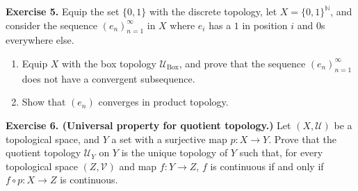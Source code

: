 \documentclass[12pt]{article}
\begin{document}
\clearpage

\noindent\textbf{Exercise 5.}
Equip the set $\{0,1\}$ with the discrete topology, let $X = \{0,1\}^{\mathbb{N}}$, and consider the sequence $(e_n)_{n=1}^{\infty}$ in $X$ where $e_i$ has a $1$ in position $i$ and $0$s everywhere else.
\begin{enumerate}
\item[(i)] Equip $X$ with the box topology $\mathcal{U}_{\mathrm{Box}}$, and prove that the sequence $(e_n)_{n=1}^{\infty}$ does not have a convergent subsequence.
\item[(ii)] Show that $(e_n)$ converges in product topology.
\end{enumerate}

\clearpage

\noindent\textbf{Exercise 6. (Universal property for quotient topology.)}
Let $(X,\mathcal{U})$ be a topological space, and $Y$ a set with a surjective map $p : X \to Y$. Prove that the quotient topology $\mathcal{U}_Y$ on $Y$ is the unique topology of $Y$ such that, for every topological space $(Z,\mathcal{V})$ and map $f : Y \to Z$, $f$ is continuous if and only if $f \circ p : X \to Z$ is continuous.
\begin{center}
\end{center}
\end{document}
